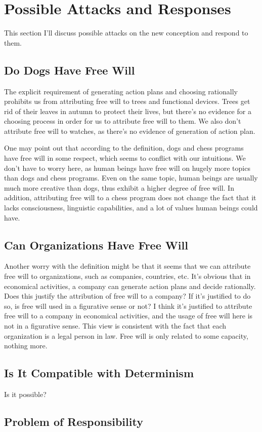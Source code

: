 \section{Possible Attacks and Responses}

This section I'll discuss possible attacks on the new conception and respond to them.

\subsection{Do Dogs Have Free Will}

The explicit requirement of generating action plans and choosing rationally prohibits us from attributing free will to trees and functional devices. Trees get rid of their leaves in autumn to protect their lives, but there’s no evidence for a choosing process in order for us to attribute free will to them. We also don’t attribute free will to watches, as there’s no evidence of generation of action plan.

One may point out that according to the definition, dogs and chess programs have free will in some respect, which seems to conflict with our intuitions. We don’t have to worry here, as human beings have free will on hugely more topics than dogs and chess programs. Even on the same topic, human beings are usually much more creative than dogs, thus exhibit a higher degree of free will. In addition, attributing free will to a chess program does not change the fact that it lacks consciousness, linguistic capabilities, and a lot of values human beings could have.

\subsection{Can Organizations Have Free Will}

Another worry with the definition might be that it seems that we can attribute free will to organizations, such as companies, countries, etc. It’s obvious that in economical activities, a company can generate action plans and decide rationally. Does this justify the attribution of free will to a company? If it’s justified to do so, is free will used in a figurative sense or not? I think it’s justified to attribute free will to a company in economical activities, and the usage of free will here is not in a figurative sense. This view is consistent with the fact that each organization is a legal person in law. Free will is only related to some capacity, nothing more.

\subsection{Is It Compatible with Determinism}

Is it possible?

\subsection{Problem of Responsibility}
